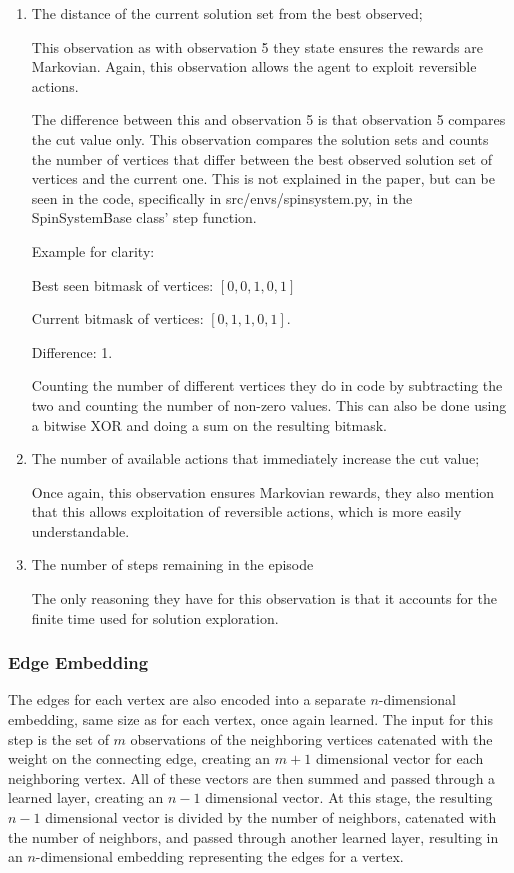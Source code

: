 \documentclass{article}
\begin{document}
\begin{enumerate}
    \item The distance of the current solution set from the best observed;
    
    This observation as with observation 5 they state ensures the rewards are Markovian. Again, this observation allows the agent to exploit reversible actions. 

    The difference between this and observation 5 is that observation 5 compares the cut value only. This observation compares the solution sets and counts the number of vertices that differ between the best observed solution set of vertices and the current one. This is not explained in the paper, but can be seen in the code, specifically in src/envs/spinsystem.py, in the SpinSystemBase class' step function.

    Example for clarity:

    Best seen bitmask of vertices: $[0, 0, 1, 0, 1]$

    Current bitmask of vertices: $[0, 1, 1, 0, 1]$.

    Difference: 1. 

    Counting the number of different vertices they do in code by subtracting the two and counting the number of non-zero values. This can also be done using a bitwise XOR and doing a sum on the resulting bitmask. 

    \item The number of available actions that immediately increase the cut value;
    
    Once again, this observation ensures Markovian rewards, they also mention that this allows exploitation of reversible actions, which is more easily understandable.

    \item The number of steps remaining in the episode
    
    The only reasoning they have for this observation is that it accounts for the finite time used for solution exploration. 

\end{enumerate}

\subsubsection{Edge Embedding}

The edges for each vertex are also encoded into a separate $n$-dimensional embedding, same size as for each vertex, once again learned. The input for this step is the set of $m$ observations of the neighboring vertices catenated with the weight on the connecting edge, creating an $m + 1$ dimensional vector for each neighboring vertex. All of these vectors are then summed and passed through a learned layer, creating an $n - 1$ dimensional vector. At this stage, the resulting $n - 1$ dimensional vector is divided by the number of neighbors, catenated with the number of neighbors, and passed through another learned layer, resulting in an $n$-dimensional embedding representing the edges for a vertex.
\end{document}

